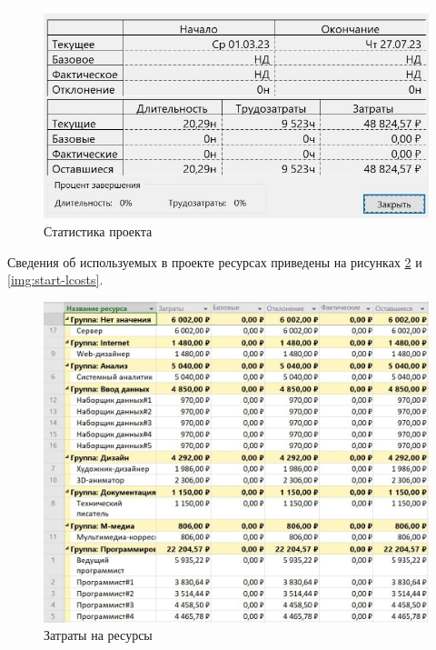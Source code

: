 \begin{figure}[H]
	\begin{center}
		\includegraphics[scale=0.3]{inc/img/start-stat.jpg}
	\end{center}
	\captionsetup{justification=centering}
	\caption{Статистика проекта}
	\label{img:start-stat}
\end{figure}

Сведения об используемых в проекте ресурсах приведены на рисунках \ref{img:start-costs} и \ref{img:start-lcosts}.

\begin{figure}[H]
	\begin{center}
		\includegraphics[scale=0.3]{inc/img/start-costs.jpg}
	\end{center}
	\captionsetup{justification=centering}
	\caption{Затраты на ресурсы}
	\label{img:start-costs}
\end{figure}

